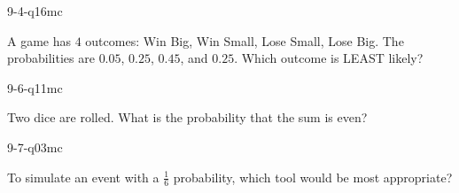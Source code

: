 \begin{practiceQuestion}{9-4-q16}{mc}
\begin{questionText}
A game has $4$ outcomes: Win Big, Win Small, Lose Small, Lose Big. The probabilities are $0.05$, $0.25$, $0.45$, and $0.25$. Which outcome is LEAST likely?
\end{questionText}
\end{practiceQuestion}

\begin{practiceQuestion}{9-6-q11}{mc}
\begin{questionText}
Two dice are rolled. What is the probability that the sum is even?
\end{questionText}
\end{practiceQuestion}

\begin{practiceQuestion}{9-7-q03}{mc}
\begin{questionText}
To simulate an event with a $\frac{1}{6}$ probability, which tool would be most appropriate?
\end{questionText}
\end{practiceQuestion}
